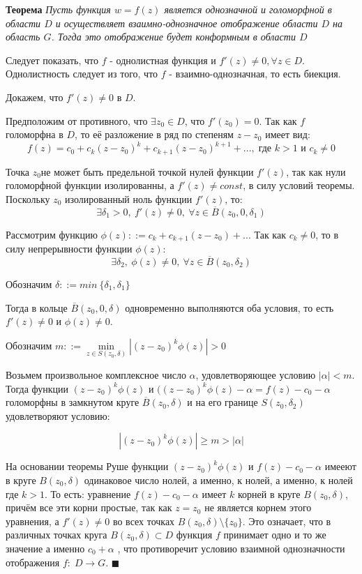 \documentclass[a4paper, 12pt]{report}
\newenvironment{Proof}
{\par\noindent{\bf Доказательство.}}
{\hfill$\scriptstyle\blacksquare$}
\begin{document}
\hangindent=11pt  \noindent \textbf{Теорема}
\textit{Пусть функция \(w = f(z)\) является однозначной и голоморфной в области \(D\)  и осуществляет взаимно-однозначное отображение области \(D\) на область \(G\). Тогда это отображение будет конформным в области \(D\)}
\begin{Proof}
Следует показать, что \(f\) - однолистная функция и \(f'(z)\neq 0, \forall z \in D\). Однолистность следует из того, что \(f\) - взаимно-однозначная, то есть биекция.

Докажем, что \(f'(z)\neq 0 \) в \(D\).

Предположим от противного, что \(\exists z_0 \in D\), что \(f'(z_0) = 0\). Так как \(f\) голоморфна в \(D\), то её разложение в ряд по степеням \(z - z_0\) имеет вид:
\[
	f(z) = c_0 + c_k(z - z_0) ^k + c_{k+1}(z-z_0)^{k+1}+..., \; \text{где } k>1 \text{ и }
 c_k \neq 0\]
 
 Точка \(z_0\)не может быть предельной точкой нулей функции \(f'(z)\), так как нули голоморфной функции изолированны, а \(f'(z) \neq const\), в силу условий теоремы. Поскольку \(z_0\) изолированный ноль функции \(f'(z)\), то:
\[
	\exists \delta_1 > 0, \: f'(z) \neq 0, \: \forall z \in \overline{B}(z_0, 0, \delta_1)
\]

Рассмотрим функцию \(\phi(z) ::= c_k + c_{k+1}(z-z_0)+...\)  Так как \(c_k \neq 0\), то в силу непрерывности функции \(\phi(z)\):
\[
\exists \delta_2, \: \phi(z) \neq 0, \: \forall z \in \overline{B}(z_0,\delta_2)
\]

Обозначим \(\delta ::= min\:\{\delta_1, \delta_1\}\) 

Тогда в кольце \(\overline{B}(z_0, 0, \delta)\) одновременно выполняются оба условия, то есть \(f'(z)\neq 0 \text{ и } \phi(z) \neq 0\).

Обозначим \(m ::= \min \limits_{z\in S(z_0, \delta)} |(z-z_0)^k\phi(z)|>0\)

Возьмем произвольное комплексное число \(\alpha\), удовлетворяющее условию \(|\alpha| < m\).
Тогда функции \((z-z_0)^k\phi(z) \text{ и } ((z-z_0)^k\phi(z)  - \alpha = f(z) - c_0 - \alpha\) голоморфны в замкнутом круге \(\overline{B}(z_0,\delta) \) и на его границе \(S(z_0,\delta_2)\) удовлетворяют условию:

\[
	|(z-z_0)^k\phi(z)|\geq m > |\alpha|
\]

На основании теоремы Руше функции \((z-z_0)^k\phi(z) \text{ и } f(z) - c_0 - \alpha\) имееют в круге \(B(z_0,\delta) \) одинаковое число нолей, а именно, к нолей, а именно, к нолей где \(k > 1\). То есть: уравнение \(f(z)-c_0-\alpha\) имеет \(k\) корней в круге \(B(z_0,\delta) \), причём все эти корни простые, так как \(z=z_0\) не является корнем этого уравнения, а \(f'(z)\neq 0\) во всех точках \(B(z_0,\delta)  \setminus \{z_0\}\). Это означает, что в различных точках круга \(B(z_0,\delta) \subset D\) функция \(f\) принимает одно и то же значение а именно \(c_0 + \alpha\) , что противоречит условию взаимной однозначности отображения \(f: \; D \rightarrow G\).
\end{Proof}
\end{document}
